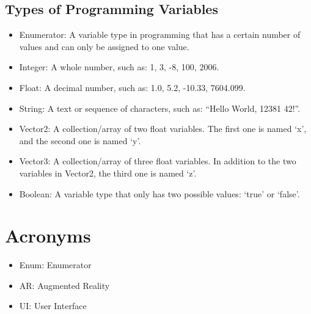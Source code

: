 \documentclass[a4paper, 12pt]{article}
\begin{document}
\subsection{Types of Programming Variables}
\begin{itemize}
    \item{Enumerator: A variable type in programming that has a certain number of values and can only be assigned to one value.}
    
    \item{Integer: A whole number, such as: 1, 3, -8, 100, 2006.}
    
    \item{Float: A decimal number, such as: 1.0, 5.2, -10.33, 7604.099.}
    
    \item{String: A text or sequence of characters, such as: “Hello World, 12381 42!”.}
    
    \item{Vector2\normalfont: A collection/array of two float variables. The first one is named ‘x’, and the second one is named ‘y’.}
    
    \item{Vector3\normalfont: A collection/array of three float variables. In addition to the two variables in Vector2\normalfont, the third one is named ‘z’.}
    
    \item{Boolean: A variable type that only has two possible values: ‘true\normalfont’ or ‘false\normalfont’.}
 \end{itemize}
\section{Acronyms}

\begin{itemize}
    \item{Enum: Enumerator}
    
    \item{AR: Augmented Reality}
    
    \item{UI: User Interface}
\end{itemize}

\printbibliography
\end{document}
